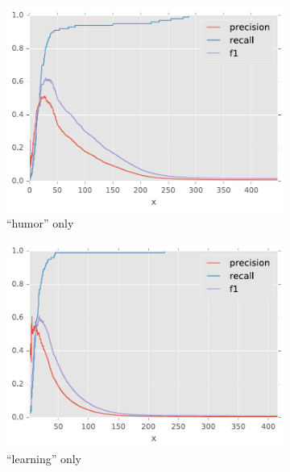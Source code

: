 \begin{figure}[H]
\begin{subfigure}[t]{.4\textwidth}
\centering\includegraphics[]{figures/reddit-humor-only-f1.pdf}
\caption{``humor'' only}
\label{fig-reddit-humor-only-f1}
\end{subfigure}
\begin{subfigure}[t]{.4\textwidth}
\centering\includegraphics[]{figures/reddit-learning-only-f1.pdf}
\caption{``learning'' only}
\label{fig-reddit-learning-only-f1}
\end{subfigure}
\begin{subfigure}[t]{.4\textwidth}

\end{subfigure}
\end{figure}
